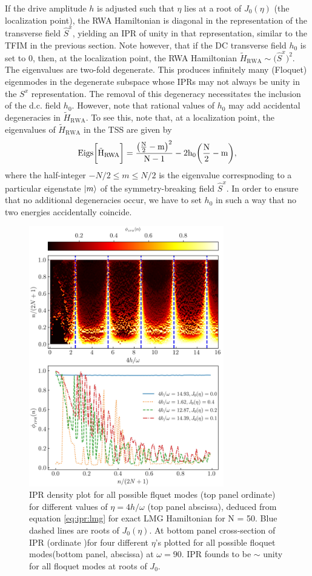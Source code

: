 \documentclass[%
reprint,
superscriptaddress,
amsmath,amssymb,
aps,
prb,
showkeys,
]{revtex4-2}
\begin{document}
	If the drive amplitude $h$ is adjusted such that $\eta$ lies at a root of $J_0(\eta)$ (the localization point), the RWA Hamiltonian is diagonal in the representation of the transverse field $\hat{S}^x$, yielding an IPR of unity in that representation, similar to the TFIM in the previous section. Note however, that if the DC transverse field $h_0$ is set to $0$, then, at the localization point, the RWA Hamiltonian $\tilde{H}_{\mathrm{RWA}}\sim
	\big(\hat{S}^x\big)^2$. The eigenvalues are two-fold degenerate. This produces infinitely many (Floquet) eigenmodes in the degenerate subspace whose IPRs may not always be unity in the $S^x$ representation. The removal of this degeneracy necessitates the inclusion of the d.c. field $h_0$. However, note that rational values of $h_0$
	 may add accidental degeneracies in $\tilde{H}_{\mathrm{RWA}}$. To see this, note that, at a localization point, the eigenvalues of $\tilde{H}_{\mathrm{RWA}}$ in the TSS are given by
	\begin{equation}
	\rm{Eigs}\bigg[\tilde{H}_{\mathrm{RWA}}\bigg] = \frac{\big(\frac{N}{2}-m\big)^2}{N-1} - 2h_0 \bigg(\frac{N}{2}-m\bigg),
	\end{equation}
	where the half-integer $-N/2\leq m \leq N/2$ is the eigenvalue correspnoding to a particular eigenstate $\ket{m}$ of the symmetry-breaking field $\hat{S}^x$. In order to ensure that no additional degeneracies occur, we have to set $h_0$ in  such a way that no two energies accidentally coincide.
	\begin{figure}[h!bt]
		\centering
		\includegraphics[width = 8.5cm]{ipr_exact_dynm_N50_frq_90_.jpeg}
		\caption{IPR density plot for all possible flquet modes (top panel ordinate) for different values of $\eta = 4h/\omega$ (top panel abscissa), deduced from equation \ref{eq:ipr:lmg} for exact LMG Hamiltonian for N = 50. Blue dashed lines are roots of $J_0(\eta)$. At bottom panel cross-section of IPR (ordinate )for four different $\eta$'s plotted for all possible floquet modes(bottom panel, abscissa) at $\omega=90$. IPR founds to be $\sim$ unity for all floquet modes at roots of $J_0$.}
		\label{fig:lmg_ipr_exact}
	\end{figure}
\end{document}
